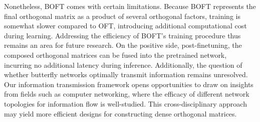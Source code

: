 Nonetheless, BOFT comes with certain limitations. Because BOFT represents the final orthogonal matrix as a product of several orthogonal factors, training is somewhat slower compared to OFT, introducing additional computational cost during learning. Addressing the efficiency of BOFT’s training procedure thus remains an area for future research. On the positive side, post-finetuning, the composed orthogonal matrices can be fused into the pretrained network, incurring no additional latency during inference. Additionally, the question of whether butterfly networks optimally transmit information remains unresolved. Our information transmission framework opens opportunities to draw on insights from fields such as computer networking, where the efficacy of different network topologies for information flow is well-studied. This cross-disciplinary approach may yield more efficient designs for constructing dense orthogonal matrices.